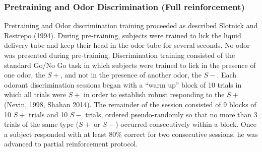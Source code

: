 \subsubsection*{Pretraining and Odor Discrimination (Full reinforcement)}
\label{sec:methods_pretraining}
Pretraining and Odor discrimination training proceeded as described Slotnick and Restrepo (1994). During pre-training, subjects were trained to lick the liquid delivery tube and keep their head in the odor tube for several seconds. No odor was presented during pre-training.
Discrimination training consisted of the standard Go/No Go task in which subjects were trained to lick in the presence of one odor, the $S+$, and not in the presence of another odor, the $S-$.  Each odorant discrimination sessions began with a ``warm up'' block of 10 trials in which all trials were $S+$ in order to establish robust responding to the $S+$  (Nevin, 1998, Shahan 2014).  The remainder of the session consisted of 9 blocks of 10 $S+$ trials and 10 $S-$ trials, ordered pseudo-randomly so that no more than 3 trials of the same type ($S+$ or $S-$) occurred consecutively within a block. Once a subject responded with at least $80\%$ correct for two consecutive sessions, he was advanced to partial reinforcement protocol.